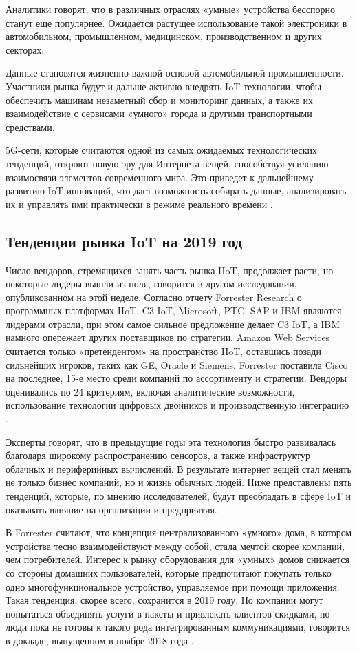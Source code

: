 Аналитики говорят, что в различных отраслях «умные» устройства бесспорно станут еще популярнее. Ожидается растущее использование такой электроники в автомобильном, промышленном, медицинском, производственном и других секторах.

Данные становятся жизненно важной основой автомобильной промышленности. Участники рынка будут и дальше активно внедрять IoT-технологии, чтобы обеспечить машинам незаметный сбор и мониторинг данных, а также их взаимодействие с сервисами «умного» города и другими транспортными средствами.

5G-сети, которые считаются одной из самых ожидаемых технологических тенденций, откроют новую эру для Интернета вещей, способствуя усилению взаимосвязи элементов современного мира. Это приведет к дальнейшему развитию IoT-инноваций, что даст возможность собирать данные, анализировать их и управлять ими практически в режиме реального времени \cite{iot_data_2019}.

\subsection{Тенденции рынка IoT на 2019 год}
\label{sec:analysis:forrester}

Число вендоров, стремящихся занять часть рынка IIoT, продолжает расти, но некоторые лидеры вышли из поля, говорится в другом исследовании, опубликованном на этой неделе. Согласно отчету Forrester Research о программных платформах IIoT, C3 IoT, Microsoft, PTC, SAP и IBM являются лидерами отрасли, при этом самое сильное предложение делает C3 IoT, а IBM намного опережает других поставщиков по стратегии. Amazon Web Services считается только «претендентом» на пространство IIoT, оставшись позади сильнейших игроков, таких как GE, Oracle и Siemens. Forrester поставила Cisco на последнее, 15-е место среди компаний по ассортименту и стратегии. Вендоры оценивались по 24 критериям, включая аналитические возможности, использование технологии цифровых двойников и производственную интеграцию \cite{iot_data_2019}.

Эксперты говорят, что в предыдущие годы эта технология быстро развивалась благодаря широкому распространению сенсоров, а также инфраструктур облачных и периферийных вычислений. В результате интернет вещей стал менять не только бизнес компаний, но и жизнь обычных людей. Ниже представлены пять тенденций, которые, по мнению исследователей, будут преобладать в сфере IoT и оказывать влияние на организации и предприятия.

В Forrester считают, что концепция централизованного «умного» дома, в котором устройства тесно взаимодействуют между собой, стала мечтой скорее компаний, чем потребителей. Интерес к рынку оборудования для «умных» домов снижается со стороны домашних пользователей, которые предпочитают покупать только одно многофункциональное устройство, управляемое при помощи приложения. Такая тенденция, скорее всего, сохранится в 2019 году. Но компании могут попытаться объединять услуги в пакеты и привлекать клиентов скидками, но люди пока не готовы к такого рода интегрированным коммуникациями, говорится в докладе, выпущенном в ноябре 2018 года \cite{iot_data_2019}.

